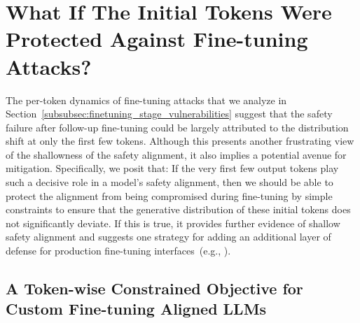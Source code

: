 \section{What If The Initial Tokens Were Protected Against Fine-tuning Attacks?}
\label{sec:constraining}

The per-token dynamics of fine-tuning attacks that we analyze in Section~\ref{subsubsec:finetuning_stage_vulnerabilities} suggest that the safety failure after follow-up fine-tuning could be largely attributed to the distribution shift at only the first few tokens. Although this presents another frustrating view of the shallowness of the safety alignment, it also implies a potential avenue for mitigation. Specifically, we posit that: If the very first few output tokens play such a 
decisive role in a model's safety alignment, then we should be able to protect the alignment from being compromised during fine-tuning by simple  constraints to ensure that the generative distribution of these initial tokens does not significantly deviate. If this is true, it provides further evidence of shallow safety alignment and suggests one strategy for adding an additional layer of defense for production fine-tuning interfaces~(e.g., \citet{openaiFinetune}). 


\subsection{A Token-wise Constrained Objective for Custom Fine-tuning Aligned LLMs}
\label{subsec:token-wise-objective-intro}

